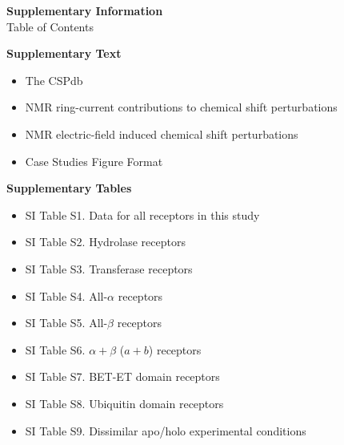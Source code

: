 \documentclass[11pt]{article}
\begin{document}
\begin{center}
{\LARGE\bfseries Supplementary Information}\\[0.6em]
{\large Table of Contents}
\end{center}
\vspace{0.8em}

\noindent\textbf{Supplementary Text}\\[0.3em]
\begin{itemize}[label={}]
\item The CSPdb
\item NMR ring-current contributions to chemical shift perturbations
\item NMR electric-field induced chemical shift perturbations
\item Case Studies Figure Format
\end{itemize}

\vspace{0.6em}
\noindent\textbf{Supplementary Tables}\\[0.3em]
\begin{itemize}[label={}]
\item SI Table S1. Data for all receptors in this study
\item SI Table S2. Hydrolase receptors
\item SI Table S3. Transferase receptors
\item SI Table S4. All-$\alpha$ receptors
\item SI Table S5. All-$\beta$ receptors
\item SI Table S6. $\alpha+\beta$ ($a{+}b$) receptors
\item SI Table S7. BET-ET domain receptors
\item SI Table S8. Ubiquitin domain receptors
\item SI Table S9. Dissimilar apo/holo experimental conditions
\end{itemize}
\end{document}
